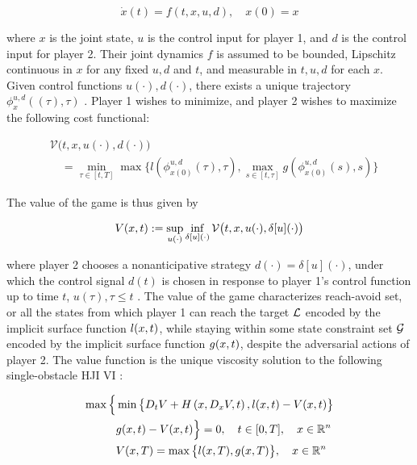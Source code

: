 \documentclass[letterpaper, 10pt, conference]{ieeeconf}      %
\begin{document}
\begin{equation}
\dot{x}(t) = f(t, x, u, d), \quad x(0) = x
\end{equation}

\noindent where $x$ is the joint state, $u$ is the control input for player 1, and $d$ is the control input for player 2. Their joint dynamics $f$ is assumed to be bounded, Lipschitz continuous in $x$ for any fixed $u,d$ and $t$, and measurable in $t,u,d$ for each $x$. Given control functions $u(\cdot), d(\cdot)$, there exists a unique trajectory $\phi_x^{u,d}((\tau),\tau)$ \cite{coddington55}. Player 1 wishes to minimize, and player 2 wishes to maximize the following cost functional:

\begin{equation}
\begin{aligned}
&\mathcal{V}\big(t,x,u(\cdot),d(\cdot)\big) \\
&\quad = \min_{\tau\in[t,T]}\max\big\{l(\phi_{x(0)}^{u,d}(\tau),\tau),\max_{s\in[t,\tau]} g(\phi_{x(0)}^{u,d}(s),s)\big\}
\end{aligned}
\end{equation}

The value of the game is thus given by

\begin{equation}
\begin{aligned}
V(x,t):=\sup_{u(\cdot)}\inf_{\delta[u](\cdot)}\mathcal{V}\big(t,x,u(\cdot),\delta[u](\cdot)\big)
\end{aligned}
\end{equation}

\noindent where player 2 chooses a nonanticipative strategy $d(\cdot) = \delta[u](\cdot)$, under which the control signal $d(t)$ is chosen in response to player 1's control function up to time $t$, $u(\tau),\tau\le t$ \cite{mitchell-thesis}. The value of the game characterizes reach-avoid set, or all the states from which player 1 can reach the target $\mathcal{L}$ encoded by the implicit surface function $l(x,t)$, while staying within some state constraint set $\mathcal{G}$ encoded by the implicit surface function $g(x,t)$, despite the adversarial actions of player 2. The value function is the unique viscosity solution \cite{crandall84} to the following single-obstacle HJI VI \cite{fisac15}:

\begin{equation}
\label{eq:HJIVI_full}
\begin{aligned}
\max\Big\{&\min\big\{D_t V + H\left(x, D_x V,t\right),l(x,t)-V(x, t)\big\}\\
& g(x,t)-V(x,t)\Big\}=0, \quad t\in[0,T], \quad x\in\mathbb{R}^n\\
&V(x,T) = \max\big\{l(x,T),g(x,T)\big\},  \quad x\in\mathbb{R}^n
\end{aligned}
\end{equation}
\end{document}
